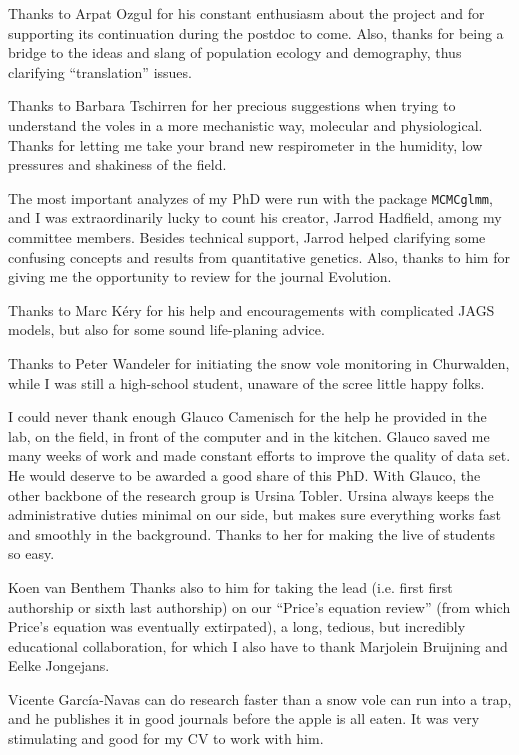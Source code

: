 Thanks to Arpat Ozgul for his constant enthusiasm about the project and for supporting its continuation during the postdoc to come. Also, thanks for being a bridge to the ideas and slang of population ecology and demography, thus clarifying ``translation'' issues. 

Thanks to Barbara Tschirren for her precious suggestions when trying to understand the voles in a more mechanistic way, molecular and physiological. Thanks for letting me take your brand new respirometer in the humidity, low pressures and shakiness of the field. 

The most important analyzes of my PhD were run with the package \texttt{MCMCglmm}, and I was extraordinarily lucky to count his creator, Jarrod Hadfield, among my committee members. Besides technical support, Jarrod helped clarifying some confusing concepts and results from quantitative genetics. Also, thanks to him for giving me the opportunity to review for the journal Evolution. 

Thanks to Marc K\'{e}ry for his help and encouragements with complicated JAGS models, but also for some sound life-planing advice. 

Thanks to Peter Wandeler for initiating the snow vole monitoring in Churwalden, while I was still a high-school student, unaware of the scree little happy folks. 

I could never thank enough Glauco Camenisch for the help he provided in the lab, on the field, in front of the computer and in the kitchen. Glauco saved me many weeks of work and made constant efforts to improve the quality of data set. He would deserve to be awarded a good share of this PhD.
With Glauco, the other backbone of the research group is Ursina Tobler. 
Ursina always keeps the administrative duties minimal on our side, but makes sure everything works fast and smoothly in the background. Thanks to her for making the live of students so easy. 


Koen van Benthem 
Thanks also to him for taking the lead (i.e. first first authorship or sixth last authorship) on our ``Price's equation review'' (from which Price's equation was eventually extirpated), a long, tedious, but incredibly educational collaboration, for which I also have to thank Marjolein Bruijning and Eelke Jongejans.

Vicente Garc\'ia-Navas can do research faster than a snow vole can run into a trap, and he publishes it in good journals before the apple is all eaten. It was very stimulating and good for my CV to work with him. 

